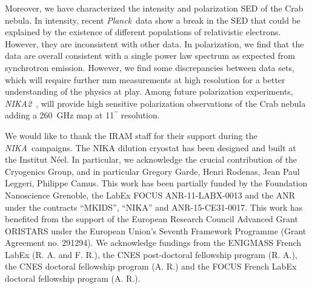\documentclass[twocolumn,traditabstract]{aa}
\def\NIKA{\textit{NIKA}}
\def\NIKAd{\textit{NIKA2}}
\def\Planck{\textit{Planck}}
\begin{document}
Moreover, we have characterized the intensity and polarization SED of the Crab nebula. In intensity, recent \Planck\ data show a break in the SED that could be explained by the existence of different populations of relativistic electrons. However, they are inconsistent with other data. In polarization, we find that the data are overall consistent with a single power law spectrum as expected from synchrotron emission. However, we find some discrepancies between data sets, which will require further mm measurements at high resolution for a better understanding of the physics at play. Among future polarization experiments, \NIKAd\ \citep{calvo2016}, will provide high sensitive polarization observations of the Crab nebula adding a 260~GHz map at 11$^{\prime\prime}$ resolution.



\vspace{0.2cm}
 \begin{acknowledgements}
We would like to thank the IRAM staff for their support during the \NIKA\ campaigns. 
The NIKA dilution cryostat has been designed and built at the Institut N\'eel. 
In particular, we acknowledge the crucial contribution of the Cryogenics Group, and 
in particular Gregory Garde, Henri Rodenas, Jean Paul Leggeri, Philippe Camus. 
This work has been partially funded by the Foundation Nanoscience Grenoble, the LabEx FOCUS ANR-11-LABX-0013 and 
the ANR under the contracts ``MKIDS'', ``NIKA'' and ANR-15-CE31-0017. 
This work has benefited from the support of the European Research Council Advanced Grant ORISTARS 
under the European Union's Seventh Framework Programme (Grant Agreement no. 291294).
We acknowledge fundings from the ENIGMASS French LabEx (R. A. and F. R.), 
the CNES post-doctoral fellowship program (R. A.),  the CNES doctoral fellowship program (A. R.) and 
the FOCUS French LabEx doctoral fellowship program (A. R.).
\end{acknowledgements}
\end{document}
